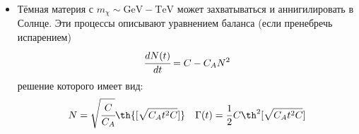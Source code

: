\begin{itemize}
	\item Тёмная материя с $m_{\chi} \sim \text{GeV} -\text{TeV} $ может захватываться и аннигилировать в Солнце. Эти процессы описывают уравнением баланса (если пренебречь испарением)
	\begin{equation*}
		\cfrac{d N(t)}{d t} = C - C_A N^2
	\end{equation*}
	решение которого имеет вид:
	\begin{equation*}
		N = \sqrt{\cfrac{C}{C_A}} \th{[\sqrt{C_A t^2C}]} \quad
		\Gamma(t) = \frac{1}{2} C \th^2{[\sqrt{C_A t^2C}]}
		\label{eq:AnnNtherm}
	\end{equation*}
 
\end{itemize}
